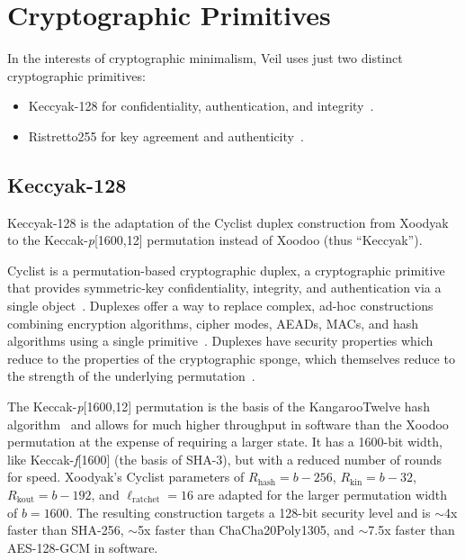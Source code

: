 \section{Cryptographic Primitives}\label{sec:cryptographic-primitives}

In the interests of cryptographic minimalism, Veil uses just two distinct cryptographic primitives:

\begin{itemize}
    \item Keccyak-128 for confidentiality, authentication, and integrity~\cite{daemen2020,bertoni2018}.
    \item Ristretto255 for key agreement and authenticity~\cite{deValence2020}.
\end{itemize}

\subsection{Keccyak-128}\label{subsec:keccyak}

Keccyak-128 is the adaptation of the Cyclist duplex construction from Xoodyak~\cite{daemen2020} to the
Keccak-\emph{p}[1600,12] permutation instead of Xoodoo (thus ``Keccyak'').

Cyclist is a permutation-based cryptographic duplex, a cryptographic primitive that provides symmetric-key
confidentiality, integrity, and authentication via a single object~\cite{daemen2020}.
Duplexes offer a way to replace complex, ad-hoc constructions combining encryption algorithms, cipher modes,
AEADs, MACs, and hash algorithms using a single primitive~\cite{daemen2020, bertoni2011duplex}.
Duplexes have security properties which reduce to the properties of the cryptographic sponge, which themselves reduce to
the strength of the underlying permutation~\cite{bertoni2008}.

The Keccak-\emph{p}[1600,12] permutation is the basis of the KangarooTwelve hash algorithm~\cite{bertoni2018} and allows
for much higher throughput in software than the Xoodoo permutation at the expense of requiring a larger state.
It has a 1600-bit width, like Keccak-\emph{f}[1600] (the basis of SHA-3), but with a reduced number of rounds for speed.
Xoodyak's Cyclist parameters of $R_\text{hash}=b-256$, $R_\text{kin}=b-32$, $R_\text{kout}=b-192$, and
$\ell_\text{ratchet}=16$ are adapted for the larger permutation width of $b=1600$.
The resulting construction targets a 128-bit security level and is $\sim$4x faster than SHA-256, $\sim$5x faster
than ChaCha20Poly1305, and $\sim$7.5x faster than AES-128-GCM in software.

